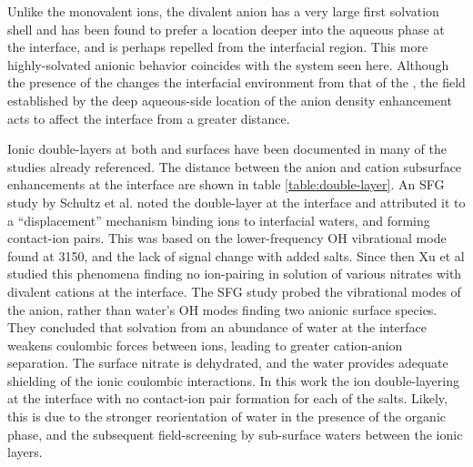 Unlike the monovalent ions, the divalent \sul anion has a very large first solvation shell and has been found to prefer a location deeper into the aqueous phase at the \airwat interface,\cite{Salvador2003} and is perhaps repelled from the interfacial region.\cite{Gopalakrishnan2005} This more highly-solvated anionic behavior coincides with the \ctcwat system seen here. Although the presence of the \ctc changes the interfacial environment from that of the \airwat, the field established by the deep aqueous-side location of the \sul anion density enhancement acts to affect the interface from a greater distance. 

Ionic double-layers at both \airwat and \ctcwat surfaces have been documented in many of the studies already referenced. The distance between the anion and cation subsurface enhancements at the \ctcwat interface are shown in table \ref{table:double-layer}. An SFG study by Schultz et al. noted the double-layer at the \airwat interface and attributed it to a ``displacement'' mechanism binding ions to interfacial waters, and forming contact-ion pairs. This was based on the lower-frequency OH vibrational mode found at 3150\cm, and the lack of signal change with added salts. Since then Xu et al studied this phenomena finding no ion-pairing in solution of various nitrates with divalent cations at the \airwat interface.\cite{Xu2009} The SFG study probed the vibrational modes of the \nit anion, rather than water's OH modes finding two anionic surface species. They concluded that solvation from an abundance of water at the interface weakens coulombic forces between ions, leading to greater cation-anion separation. The surface nitrate is dehydrated, and the water provides adequate shielding of the ionic coulombic interactions. In this work the ion double-layering at the \ctcwat interface with no contact-ion pair formation for each of the salts. Likely, this is due to the stronger reorientation of water in the presence of the organic phase, and the subsequent field-screening by sub-surface waters between the ionic layers.


